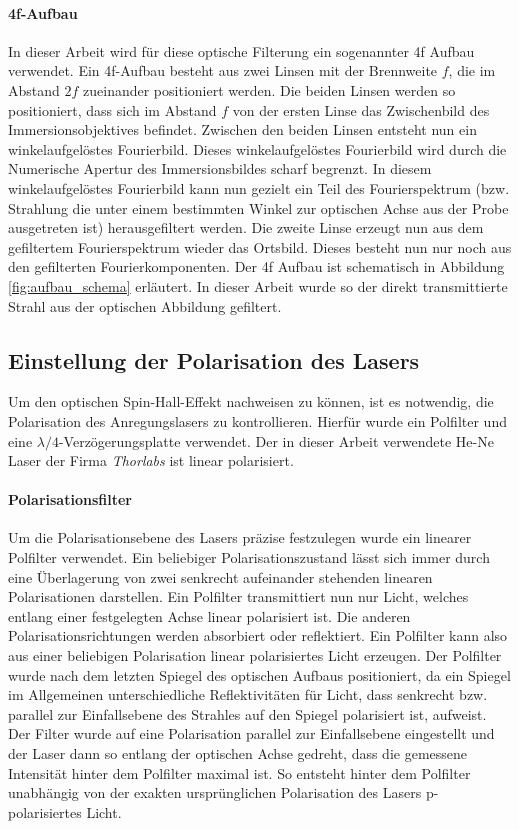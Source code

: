 \documentclass[titlepage]{article}
\begin{document}
	\paragraph{4f-Aufbau}
	In dieser Arbeit wird für diese optische Filterung ein sogenannter 4f Aufbau verwendet. Ein 4f-Aufbau besteht aus zwei Linsen mit der Brennweite $f$, die im Abstand $2f$ zueinander positioniert werden. Die beiden Linsen werden so positioniert, dass sich im Abstand $f$ von der ersten Linse das Zwischenbild des Immersionsobjektives befindet. Zwischen den beiden Linsen entsteht nun ein winkelaufgelöstes Fourierbild. Dieses winkelaufgelöstes Fourierbild wird durch die Numerische Apertur des Immersionsbildes scharf begrenzt.  In diesem winkelaufgelöstes Fourierbild kann nun gezielt ein Teil des Fourierspektrum (bzw. Strahlung die unter einem bestimmten Winkel zur optischen Achse aus der Probe ausgetreten ist) herausgefiltert werden. Die zweite Linse erzeugt nun aus dem gefiltertem Fourierspektrum wieder das Ortsbild. Dieses besteht nun nur noch aus den gefilterten Fourierkomponenten. Der 4f Aufbau ist schematisch in Abbildung \ref{fig:aufbau_schema} erläutert. In dieser Arbeit wurde so der direkt transmittierte Strahl aus der optischen Abbildung gefiltert.
	\subsection{Einstellung der Polarisation des Lasers}
	\label{sec:cntr_pol}
	Um den optischen Spin-Hall-Effekt nachweisen zu können, ist es notwendig, die Polarisation des Anregungslasers zu kontrollieren. Hierfür wurde ein Polfilter und eine $\lambda /4$-Verzögerungsplatte verwendet. Der in dieser Arbeit verwendete He-Ne Laser der Firma \textit{Thorlabs} ist linear polarisiert. 
	\paragraph{Polarisationsfilter}	
	Um die Polarisationsebene des Lasers präzise festzulegen wurde ein linearer Polfilter verwendet. Ein beliebiger Polarisationszustand lässt sich immer durch eine Überlagerung von zwei senkrecht aufeinander stehenden linearen Polarisationen darstellen. Ein Polfilter transmittiert nun nur Licht, welches entlang einer festgelegten Achse linear polarisiert ist. Die anderen Polarisationsrichtungen werden absorbiert oder reflektiert. Ein Polfilter kann also aus einer beliebigen Polarisation linear polarisiertes Licht erzeugen. Der  Polfilter wurde nach dem letzten Spiegel des optischen Aufbaus positioniert, da ein Spiegel im Allgemeinen unterschiedliche Reflektivitäten für Licht, dass senkrecht bzw. parallel zur Einfallsebene des Strahles auf den Spiegel polarisiert ist, aufweist. Der Filter wurde auf eine Polarisation parallel zur Einfallsebene eingestellt und der Laser dann so entlang der optischen Achse gedreht, dass die gemessene Intensität hinter dem Polfilter maximal ist. So entsteht hinter dem Polfilter unabhängig  von der exakten ursprünglichen Polarisation des Lasers p-polarisiertes Licht.
\end{document}

